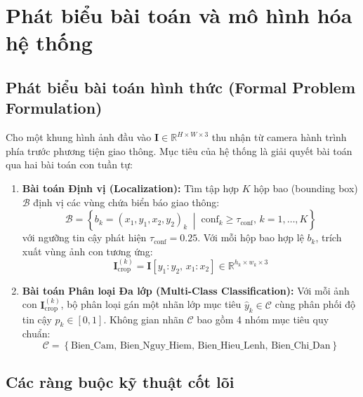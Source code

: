 \section{Phát biểu bài toán và mô hình hóa hệ thống}
\label{sec:phat_bieu_bai_toan}

\subsection{Phát biểu bài toán hình thức (Formal Problem Formulation)}
\label{subsec:phat_bieu_hinh_thuc}

Cho một khung hình ảnh đầu vào $\mathbf{I} \in \mathbb{R}^{H \times W \times 3}$ thu nhận từ camera hành trình phía trước phương tiện giao thông. Mục tiêu của hệ thống là giải quyết bài toán qua hai bài toán con tuần tự:

\begin{enumerate}
    \item \textbf{Bài toán Định vị (Localization):} Tìm tập hợp $K$ hộp bao (bounding box) $\mathcal{B}$ định vị các vùng chứa biển báo giao thông:
    \begin{equation}
        \mathcal{B} = \left\{ b_k = (x_1, y_1, x_2, y_2)_k \;\middle|\; \text{conf}_k \ge \tau_{\text{conf}}, \, k = 1, \dots, K \right\}
        \label{eq:localization}
    \end{equation}
    với ngưỡng tin cậy phát hiện $\tau_{\text{conf}} = 0.25$. Với mỗi hộp bao hợp lệ $b_k$, trích xuất vùng ảnh con tương ứng:
    \begin{equation}
        \mathbf{I}^{(k)}_{\text{crop}} = \mathbf{I}[y_1 : y_2, \, x_1 : x_2] \in \mathbb{R}^{h_k \times w_k \times 3}
        \label{eq:crop}
    \end{equation}

    \item \textbf{Bài toán Phân loại Đa lớp (Multi-Class Classification):} Với mỗi ảnh con $\mathbf{I}^{(k)}_{\text{crop}}$, bộ phân loại gán một nhãn lớp mục tiêu $\hat{y}_k \in \mathcal{C}$ cùng phân phối độ tin cậy $p_k \in [0, 1]$. Không gian nhãn $\mathcal{C}$ bao gồm 4 nhóm mục tiêu quy chuẩn:
    \begin{equation}
        \mathcal{C} = \left\{ \text{Bien\_Cam}, \, \text{Bien\_Nguy\_Hiem}, \, \text{Bien\_Hieu\_Lenh}, \, \text{Bien\_Chi\_Dan} \right\}
        \label{eq:classes}
    \end{equation}
\end{enumerate}

\subsection{Các ràng buộc kỹ thuật cốt lõi}
\label{subsec:rang_buoc_ky_thuat}

